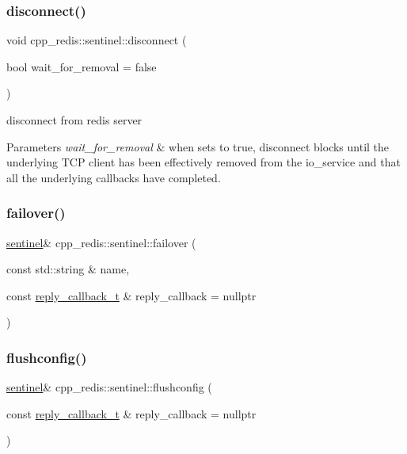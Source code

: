 \subsubsection{\texorpdfstring{disconnect()}{disconnect()}}
{\footnotesize\ttfamily void cpp\+\_\+redis\+::sentinel\+::disconnect (\begin{DoxyParamCaption}\item[{bool}]{wait\+\_\+for\+\_\+removal = {\ttfamily false} }\end{DoxyParamCaption})}

disconnect from redis server


\begin{DoxyParams}{Parameters}
{\em wait\+\_\+for\+\_\+removal} & when sets to true, disconnect blocks until the underlying T\+CP client has been effectively removed from the io\+\_\+service and that all the underlying callbacks have completed. \\
\hline
\end{DoxyParams}
\mbox{\label{classcpp__redis_1_1sentinel_abd4ee07b5a17ca15b74d25702687e53a}} 
\subsubsection{\texorpdfstring{failover()}{failover()}}
{\footnotesize\ttfamily \hyperlink{classcpp__redis_1_1sentinel}{sentinel}\& cpp\+\_\+redis\+::sentinel\+::failover (\begin{DoxyParamCaption}\item[{const std\+::string \&}]{name,  }\item[{const \hyperlink{classcpp__redis_1_1sentinel_ae1a150ff8787208c47414397a061c9a7}{reply\+\_\+callback\+\_\+t} \&}]{reply\+\_\+callback = {\ttfamily nullptr} }\end{DoxyParamCaption})}

\mbox{\label{classcpp__redis_1_1sentinel_ab3c3a6822ebd512217280b0ca1a0f29f}} 
\subsubsection{\texorpdfstring{flushconfig()}{flushconfig()}}
{\footnotesize\ttfamily \hyperlink{classcpp__redis_1_1sentinel}{sentinel}\& cpp\+\_\+redis\+::sentinel\+::flushconfig (\begin{DoxyParamCaption}\item[{const \hyperlink{classcpp__redis_1_1sentinel_ae1a150ff8787208c47414397a061c9a7}{reply\+\_\+callback\+\_\+t} \&}]{reply\+\_\+callback = {\ttfamily nullptr} }\end{DoxyParamCaption})}

